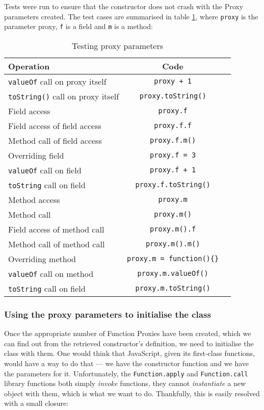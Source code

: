 Tests were run to ensure that the constructor does not crash with the Proxy parameters created. The test cases are summarised in table \ref{nocrash}, where \texttt{proxy} is the parameter proxy, \texttt{f} is a field and \texttt{m} is a method:

\begin{table}[h]
\centering
\begin{tabular}{|l|c|c|}
\hline
\textbf{Operation} & \textbf{Code} \\
\hline
\texttt{valueOf} call on proxy itself & \texttt{proxy + 1}\\
\texttt{toString()} call on proxy itself & \texttt{proxy.toString()}\\
Field access & \texttt{proxy.f} \\
Field access of field access & \texttt{proxy.f.f} \\
Method call of field access & \texttt{proxy.f.m()} \\
Overriding field & \texttt{proxy.f = 3} \\
\texttt{valueOf} call on field & \texttt{proxy.f + 1} \\
\texttt{toString} call on field & \texttt{proxy.f.toString()} \\
Method access & \texttt{proxy.m} \\
Method call & \texttt{proxy.m()} \\
Field access of method call & \texttt{proxy.m().f} \\
Method call of method call & \texttt{proxy.m().m()} \\
Overriding method & \texttt{proxy.m = function()\{\}} \\
\texttt{valueOf} call on method & \texttt{proxy.m.valueOf()} \\
\texttt{toString} call on field & \texttt{proxy.m.toString()} \\
\hline
\end{tabular}
\caption{Testing proxy parameters}
\label{nocrash}
\end{table}

\subsubsection{Using the proxy parameters to initialise the class}
Once the appropriate number of Function Proxies have been created, which we can find out from the retrieved constructor's definition, we need to initialise the class with them. One would think that JavaScript, given its first-class functions, would have a way to do that --- we have the constructor function and we have the parameters for it. Unfortunately, the \texttt{Function.apply} and \texttt{Function.call} library functions both simply \emph{invoke} functions, they cannot \emph{instantiate} a new object with them, which is what we want to do. Thankfully, this is easily resolved with a small closure:

